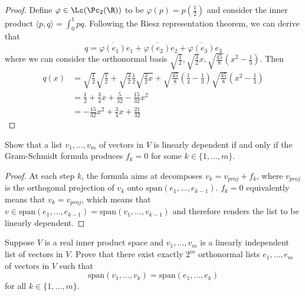 \documentclass{extarticle}
\begin{document}
\begin{proof}
Define \(\varphi \in \Lc(\Pc_2(\R))\) to be \(\varphi(p) = p(\frac{1}{2})\) and consider the inner 
product \(\langle p,q \rangle = \int_{0}^{1} pq\). Following the Riesz representation theorem, we 
can derive that 
\[q =  \overline{\varphi(e_1)}e_1 + \overline{\varphi(e_2)}e_2 + \overline{\varphi(e_3)}e_3\]
where we can consider the orthonormal basis \(\sqrt{\frac{1}{2}}, \sqrt{\frac{3}{2}}x, 
\sqrt{\frac{45}{8}}(x^2 - \frac{1}{3})\). Then 
\begin{align*}
    q(x) &= \sqrt{\frac{1}{2}} \sqrt{\frac{1}{2}}  + \sqrt{\frac{3}{2}} \frac{1}{2} \sqrt{\frac{3}{2}x}
    + \sqrt{\frac{45}{8}}\left(\frac{1}{4} - \frac{1}{3}\right) \sqrt{\frac{45}{8}} \left(x^2 - \frac{1}{3}\right) \\ 
    &= \frac{1}{2} + \frac{3}{4}x + \frac{5}{32} - \frac{15}{32}x^2 \\ 
    &= -\frac{15}{32}x^2 + \frac{3}{4}x + \frac{21}{32} 
\end{align*}
\end{proof}

\begin{problem}{13}
    Show that a list \(v_1, \ldots, v_m\) of vectors in \(V\) is linearly dependent if and only if 
    the Gram-Schmidt formula produces \(f_k = 0\) for some \(k \in \{1, \ldots, m\}\).
\end{problem}

\begin{proof}
At each step \(k\), the formula aims at decomposes \(v_k = v_{proj} + f_k\), where \(v_{proj}\) is the 
orthogonal projection of \(v_k\) onto \(\text{span}(e_1, \ldots, e_{k-1})\). \(f_k = 0\) equivalently 
means that \(v_k = v_{proj}\), which means that \(v \in \text{span}(e_1, \ldots, e_{k-1}) 
= \text{span}(v_1, \ldots, v_{k-1})\) and therefore renders the list to be linearly dependent. 
\end{proof}

\begin{problem}{14}
    Suppose \(V\) is a real inner product space and \(v_1, \ldots, v_m\) is a linearly independent list of 
    vectors in \(V\). Prove that there exist exactly \(2^m\) orthonormal lists \(e_1, \ldots, e_m\) of 
    vectors in \(V\) such that 
    \[\text{span}(v_1, \ldots, v_k)  = \text{span}(e_1, \ldots, e_k)\]
    for all \(k \in \{1, \ldots, m\}\).
\end{problem}
\end{document}

